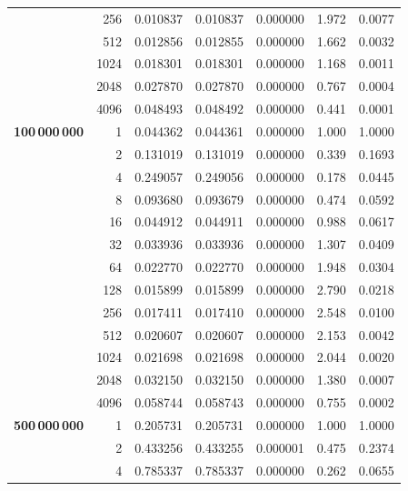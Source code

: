 \documentclass[a4paper,11pt]{article}
\begin{document}
\begin{center}
\begin{longtable}{crccccc}
                       & 256  & 0.010837 & 0.010837 & 0.000000 & 1.972  & 0.0077 \\
                       & 512  & 0.012856 & 0.012855 & 0.000000 & 1.662  & 0.0032 \\
                       & 1024 & 0.018301 & 0.018301 & 0.000000 & 1.168  & 0.0011 \\
                       & 2048 & 0.027870 & 0.027870 & 0.000000 & 0.767  & 0.0004 \\
                       & 4096 & 0.048493 & 0.048492 & 0.000000 & 0.441  & 0.0001 \\
    \midrule
    \textbf{100\,000\,000} & 1    & 0.044362 & 0.044361 & 0.000000 & 1.000  & 1.0000 \\
                       & 2    & 0.131019 & 0.131019 & 0.000000 & 0.339  & 0.1693 \\
                       & 4    & 0.249057 & 0.249056 & 0.000000 & 0.178  & 0.0445 \\
                       & 8    & 0.093680 & 0.093679 & 0.000000 & 0.474  & 0.0592 \\
                       & 16   & 0.044912 & 0.044911 & 0.000000 & 0.988  & 0.0617 \\
                       & 32   & 0.033936 & 0.033936 & 0.000000 & 1.307  & 0.0409 \\
                       & 64   & 0.022770 & 0.022770 & 0.000000 & 1.948  & 0.0304 \\
                       & 128  & 0.015899 & 0.015899 & 0.000000 & 2.790  & 0.0218 \\
                       & 256  & 0.017411 & 0.017410 & 0.000000 & 2.548  & 0.0100 \\
                       & 512  & 0.020607 & 0.020607 & 0.000000 & 2.153  & 0.0042 \\
                       & 1024 & 0.021698 & 0.021698 & 0.000000 & 2.044  & 0.0020 \\
                       & 2048 & 0.032150 & 0.032150 & 0.000000 & 1.380  & 0.0007 \\
                       & 4096 & 0.058744 & 0.058743 & 0.000000 & 0.755  & 0.0002 \\
    \midrule
    \textbf{500\,000\,000} & 1    & 0.205731 & 0.205731 & 0.000000 & 1.000  & 1.0000 \\
                       & 2    & 0.433256 & 0.433255 & 0.000001 & 0.475  & 0.2374 \\
                       & 4    & 0.785337 & 0.785337 & 0.000000 & 0.262  & 0.0655 \\

\end{longtable}
\end{center}
\end{document}
